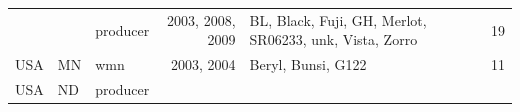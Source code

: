 \begin{longtable}[]{@{}lllrlr@{}}
\begin{minipage}[t]{0.11\columnwidth}\raggedright\strut
\strut
\end{minipage} & \begin{minipage}[t]{0.08\columnwidth}\raggedright\strut
\strut
\end{minipage} & \begin{minipage}[t]{0.12\columnwidth}\raggedright\strut
producer\strut
\end{minipage} & \begin{minipage}[t]{0.19\columnwidth}\raggedleft\strut
2003, 2008, 2009\strut
\end{minipage} & \begin{minipage}[t]{0.29\columnwidth}\raggedright\strut
BL, Black, Fuji, GH, Merlot, SR06233, unk, Vista, Zorro\strut
\end{minipage} & \begin{minipage}[t]{0.04\columnwidth}\raggedleft\strut
19\strut
\end{minipage}\tabularnewline
\begin{minipage}[t]{0.11\columnwidth}\raggedright\strut
USA\strut
\end{minipage} & \begin{minipage}[t]{0.08\columnwidth}\raggedright\strut
MN\strut
\end{minipage} & \begin{minipage}[t]{0.12\columnwidth}\raggedright\strut
wmn\strut
\end{minipage} & \begin{minipage}[t]{0.19\columnwidth}\raggedleft\strut
2003, 2004\strut
\end{minipage} & \begin{minipage}[t]{0.29\columnwidth}\raggedright\strut
Beryl, Bunsi, G122\strut
\end{minipage} & \begin{minipage}[t]{0.04\columnwidth}\raggedleft\strut
11\strut
\end{minipage}\tabularnewline
\begin{minipage}[t]{0.11\columnwidth}\raggedright\strut
USA\strut
\end{minipage} & \begin{minipage}[t]{0.08\columnwidth}\raggedright\strut
ND\strut
\end{minipage} & \begin{minipage}[t]{0.12\columnwidth}\raggedright\strut
producer\strut
\end{minipage} & \begin{minipage}[t]{0.19\columnwidth}\raggedleft\strut

\end{minipage}
\end{longtable}
